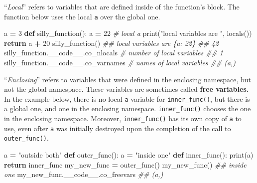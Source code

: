 \documentclass[
  12pt,
  krantz2]{krantz}
\makeatletter
\newenvironment{Shaded}{\begin{snugshade}}{\end{snugshade}}
\newcommand{\BuiltInTok}[1]{#1}
\newcommand{\CommentTok}[1]{\textcolor[rgb]{0.37,0.37,0.37}{\textit{#1}}}
\newcommand{\ControlFlowTok}[1]{\textcolor[rgb]{0.27,0.27,0.27}{\textbf{#1}}}
\newcommand{\DecValTok}[1]{\textcolor[rgb]{0.06,0.06,0.06}{#1}}
\newcommand{\KeywordTok}[1]{\textcolor[rgb]{0.27,0.27,0.27}{\textbf{#1}}}
\newcommand{\NormalTok}[1]{#1}
\newcommand{\OperatorTok}[1]{\textcolor[rgb]{0.43,0.43,0.43}{\textbf{#1}}}
\newcommand{\StringTok}[1]{\textcolor[rgb]{0.5,0.5,0.5}{#1}}
\newenvironment{kframe}{%
\medskip{}
\setlength{\fboxsep}{.8em}
 \def\at@end@of@kframe{}%
 \ifinner\ifhmode%
  \def\at@end@of@kframe{\end{minipage}}%
  \begin{minipage}{\columnwidth}%
 \fi\fi%
 \def\FrameCommand##1{\hskip\@totalleftmargin \hskip-\fboxsep
 \colorbox{shadecolor}{##1}\hskip-\fboxsep
     \hskip-\linewidth \hskip-\@totalleftmargin \hskip\columnwidth}%
 \MakeFramed {\advance\hsize-\width
   \@totalleftmargin\z@ \linewidth\hsize
   \@setminipage}}%
 {\par\unskip\endMakeFramed%
 \at@end@of@kframe}
\renewenvironment{Shaded}{\begin{kframe}}{\end{kframe}}
\makeatother
\begin{document}
``\emph{Local}'' refers to variables that are defined inside of the function's block. The function below uses the local \texttt{a} over the global one.

\begin{Shaded}
\begin{Highlighting}[]
\NormalTok{a }\OperatorTok{=} \DecValTok{3}
\KeywordTok{def}\NormalTok{ silly\_function():}
\NormalTok{    a }\OperatorTok{=} \DecValTok{22} \CommentTok{\# local a}
    \BuiltInTok{print}\NormalTok{(}\StringTok{"local variables are "}\NormalTok{, }\BuiltInTok{locals}\NormalTok{())}
    \ControlFlowTok{return}\NormalTok{ a }\OperatorTok{+} \DecValTok{20}
\NormalTok{silly\_function()}
\CommentTok{\#\# local variables are  \{\textquotesingle{}a\textquotesingle{}: 22\}}
\CommentTok{\#\# 42}
\NormalTok{silly\_function.\_\_code\_\_.co\_nlocals }\CommentTok{\# number of local variables}
\CommentTok{\#\# 1}
\NormalTok{silly\_function.\_\_code\_\_.co\_varnames }\CommentTok{\# names of local variables}
\CommentTok{\#\# (\textquotesingle{}a\textquotesingle{},)}
\end{Highlighting}
\end{Shaded}

``\emph{Enclosing}'' refers to variables that were defined in the enclosing namespace, but not the global namespace. These variables are sometimes called \textbf{free variables.} In the example below, there is no local \texttt{a} variable for \texttt{inner\_func()}, but there is a global one, and one in the enclosing namespace. \texttt{inner\_func()} chooses the one in the enclosing namespace. Moreover, \texttt{inner\_func()} has its own copy of \texttt{a} to use, even after \texttt{a} was initially destroyed upon the completion of the call to \texttt{outer\_func()}.

\begin{Shaded}
\begin{Highlighting}[]
\NormalTok{a }\OperatorTok{=} \StringTok{"outside both"}
\KeywordTok{def}\NormalTok{ outer\_func():}
\NormalTok{    a }\OperatorTok{=} \StringTok{"inside one"}
    \KeywordTok{def}\NormalTok{ inner\_func():}
        \BuiltInTok{print}\NormalTok{(a)}
    \ControlFlowTok{return}\NormalTok{ inner\_func}
\NormalTok{my\_new\_func }\OperatorTok{=}\NormalTok{ outer\_func()}
\NormalTok{my\_new\_func()}
\CommentTok{\#\# inside one}
\NormalTok{my\_new\_func.\_\_code\_\_.co\_freevars}
\CommentTok{\#\# (\textquotesingle{}a\textquotesingle{},)}
\end{Highlighting}
\end{Shaded}
\end{document}
